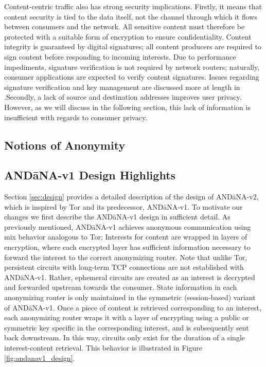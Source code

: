 Content-centric traffic also has strong security implications. Firstly, it means that content security is tied to the data itself, not the channel through which it flows between consumers and the network. All sensitive content must therefore be protected with a suitable form of encryption to ensure confidentiality. Content integrity is guaranteed by digital signatures; all content producers are required to sign content before responding to incoming interests. Due to performance impediments, signature verification is not required by network routers; naturally, consumer applications are expected to verify content signatures. Issues regarding signature verification and key management are discussed more at length in \cite{}.Secondly, a lack of source and destination addresses improves user privacy. However, as we will discuss in the following section, this lack of information is insufficient with regards to consumer privacy. 

\subsection{Notions of Anonymity}

\subsection{AND\=aNA-v1 Design Highlights}
Section \ref{sec:design} provides a detailed description of the design of {\sf AND\=aNA-v2}, which is inspired by Tor and its predecessor, {\sf AND\=aNA-v1}. To motivate our changes we first describe the {\sf AND\=aNA-v1} design in sufficient detail. As previously mentioned, {\sf AND\=aNA-v1} achieves anonymous communication using mix behavior analogous to Tor; Interests for content are wrapped in layers of encryption, where each encrypted layer has sufficient information necessary to forward the interest to the correct anonymizing router. Note that unlike Tor, persistent circuits with long-term TCP connections are not established with {\sf AND\=aNA-v1}. Rather, ephemeral circuits are created as an interest is decrypted and forwarded upstream towards the consumer. State information in each anonymizing router is only maintained in the symmetric (session-based) variant of {\sf AND\=aNA-v1}. Once a piece of content is retrieved corresponding to an interest, each anonymizing router wraps it with a layer of encrypting using a public or symmetric key specific in the corresponding interest, and is subsequently sent back downstream. In this way, circuits only exist for the duration of a single interest-content retrieval. This behavior is illustrated in Figure \ref{fig:andanav1_design}.

